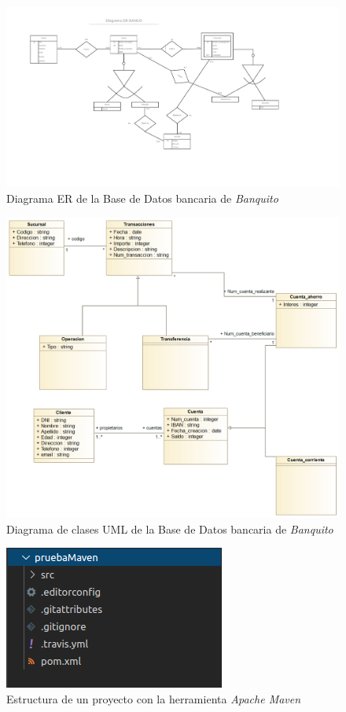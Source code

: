 \documentclass[11pt,a4paper]{article}
\begin{document}
\begin{landscape}
\begin{figure}
\centering
\includegraphics[scale=0.75]{images/diagramaer.png}
\caption{Diagrama ER de la Base de Datos bancaria de \emph{Banquito}}
\label{fig:diagramaer}
\end{figure}
\end{landscape}

\begin{figure}
\centering
\includegraphics[scale=0.45]{images/diagramauml.png}
\caption{Diagrama de clases UML de la Base de Datos bancaria de \emph{Banquito}}
\label{fig:diagramauml}
\end{figure}

\begin{figure}
\centering
\includegraphics[scale=1]{images/estructuraMAVEN.png}
\caption{Estructura de un proyecto con la herramienta \emph{Apache Maven}}
\label{fig:estructuraMAVEN}
\end{figure}
\end{document}
